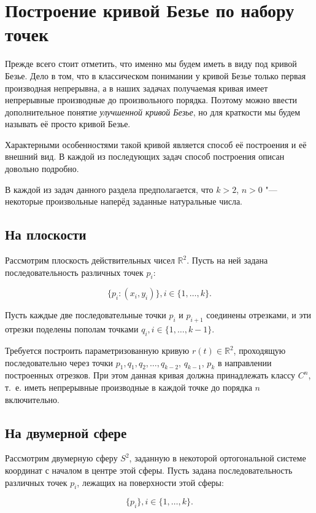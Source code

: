 \section{Построение кривой Безье по набору точек}

Прежде всего стоит отметить, что именно мы будем иметь в виду под кривой Безье. Дело в том, что в классическом
понимании у кривой Безье только первая производная непрерывна, а в наших задачах получаемая кривая имеет непрерывные
производные до произвольного порядка. Поэтому можно ввести дополнительное понятие \textit{улучшенной кривой Безье},
но для краткости мы будем называть её просто кривой Безье.

Характерными особенностями такой кривой является способ её построения и её внешний вид. В каждой из последующих задач
способ построения описан довольно подробно.

В каждой из задач данного раздела предполагается, что $k>2$, $n>0$ "--- некоторые произвольные наперёд заданные
натуральные числа.

\subsection*{На плоскости}

Рассмотрим плоскость действительных чисел $\mathbb{R}^2$. Пусть на ней задана последовательность различных точек $p_i$:

$$\{p_i: (x_i, y_i)\}, i \in \{1, \dots, k\}.$$

Пусть каждые две последовательные точки $p_i$ и $p_{i+1}$ соединены отрезками, и эти отрезки поделены пополам точками
$q_i, i \in \{1, \dots, k-1\}$.

Требуется построить параметризованную кривую $r(t) \in \mathbb{R}^2$, проходящую последовательно через точки $p_1,
q_1, q_2, \dots, q_{k-2}$, $q_{k-1}$, $p_k$ в направлении построенных отрезков. При этом данная кривая должна принадлежать
классу $C^n$, т.~е. иметь непрерывные производные в каждой точке до порядка $n$ включительно.

\subsection*{На двумерной сфере}

Рассмотрим двумерную сферу $S^2$, заданную в некоторой ортогональной системе координат с началом в центре этой сферы.
Пусть задана последовательность различных точек $p_i$, лежащих на поверхности этой сферы:

$$\{p_i\}, i \in \{1, \dots, k\}.$$

